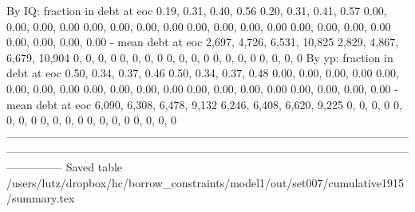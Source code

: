         By IQ: fraction in debt at eoc       0.19, 0.31, 0.40, 0.56       0.20, 0.31, 0.41, 0.57   0.00, 0.00, 0.00, 0.00    0.00, 0.00, 0.00, 0.00      0.00, 0.00, 0.00, 0.00      0.00, 0.00, 0.00, 0.00      0.00, 0.00, 0.00, 0.00
                    - mean debt at eoc  2,697, 4,726, 6,531, 10,825  2,829, 4,867, 6,679, 10,904               0, 0, 0, 0                0, 0, 0, 0                  0, 0, 0, 0                  0, 0, 0, 0                  0, 0, 0, 0
        By yp: fraction in debt at eoc       0.50, 0.34, 0.37, 0.46       0.50, 0.34, 0.37, 0.48   0.00, 0.00, 0.00, 0.00    0.00, 0.00, 0.00, 0.00      0.00, 0.00, 0.00, 0.00      0.00, 0.00, 0.00, 0.00      0.00, 0.00, 0.00, 0.00
                    - mean debt at eoc   6,090, 6,308, 6,478, 9,132   6,246, 6,408, 6,620, 9,225               0, 0, 0, 0                0, 0, 0, 0                  0, 0, 0, 0                  0, 0, 0, 0                  0, 0, 0, 0
---------------------------------------------------------------------------------------------------------------------------------------------------------------------------------------------------------------------------------------
Saved table  /users/lutz/dropbox/hc/borrow_constraints/model1/out/set007/cumulative1915/summary.tex 
